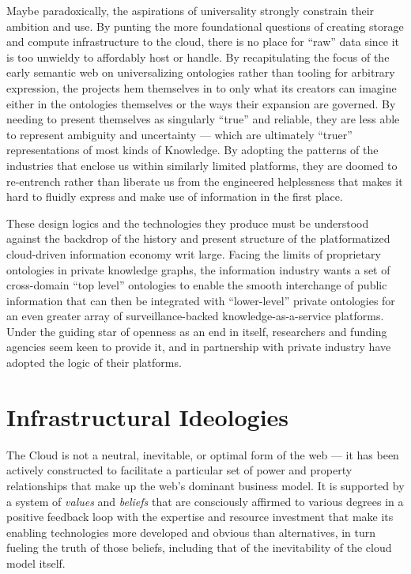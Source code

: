 Maybe paradoxically, the aspirations of universality strongly constrain
their ambition and use. By punting the more foundational questions of
creating storage and compute infrastructure to the cloud, there is no
place for ``raw'' data since it is too unwieldy to affordably host or
handle. By recapitulating the focus of the early semantic web on
universalizing ontologies rather than tooling for arbitrary expression,
the projects hem themselves in to only what its creators can imagine
either in the ontologies themselves or the ways their expansion are
governed. By needing to present themselves as singularly ``true'' and
reliable, they are less able to represent ambiguity and uncertainty ---
which are ultimately ``truer'' representations of most kinds of
Knowledge. By adopting the patterns of the industries that enclose us
within similarly limited platforms, they are doomed to re-entrench
rather than liberate us from the engineered helplessness that makes it
hard to fluidly express and make use of information in the first place.

These design logics and the technologies they produce must be understood
against the backdrop of the history and present structure of the
platformatized cloud-driven information economy writ large. Facing the
limits of proprietary ontologies in private knowledge graphs, the
information industry wants a set of cross-domain ``top level''
ontologies to enable the smooth interchange of public information that
can then be integrated with ``lower-level'' private ontologies for an
even greater array of surveillance-backed knowledge-as-a-service
platforms. Under the guiding star of openness as an end in itself,
researchers and funding agencies seem keen to provide it, and in
partnership with private industry have adopted the logic of their
platforms.

\hypertarget{infrastructural-ideologies}{%
\section{Infrastructural Ideologies}\label{infrastructural-ideologies}}

The Cloud is not a neutral, inevitable, or optimal form of the web ---
it has been actively constructed to facilitate a particular set of power
and property relationships that make up the web's dominant business
model. It is supported by a system of \emph{values} and \emph{beliefs}
that are consciously affirmed to various degrees in a positive feedback
loop with the expertise and resource investment that make its enabling
technologies more developed and obvious than alternatives, in turn
fueling the truth of those beliefs, including that of the inevitability
of the cloud model itself.

